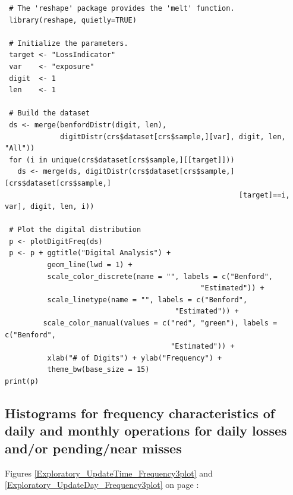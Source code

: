 \documentclass{DissertateUSU}
\begin{document}
\begin{verbatim}
 # The 'reshape' package provides the 'melt' function.
 library(reshape, quietly=TRUE)
 
 # Initialize the parameters.
 target <- "LossIndicator"
 var    <- "exposure"
 digit  <- 1
 len    <- 1
 
 # Build the dataset
 ds <- merge(benfordDistr(digit, len),
             digitDistr(crs$dataset[crs$sample,][var], digit, len, "All"))
 for (i in unique(crs$dataset[crs$sample,][[target]]))
   ds <- merge(ds, digitDistr(crs$dataset[crs$sample,][crs$dataset[crs$sample,]
                                                       [target]==i, var], digit, len, i))
 
 # Plot the digital distribution
 p <- plotDigitFreq(ds)
 p <- p + ggtitle("Digital Analysis") +
          geom_line(lwd = 1) +
          scale_color_discrete(name = "", labels = c("Benford",
                                              "Estimated")) +
          scale_linetype(name = "", labels = c("Benford",
                                        "Estimated")) +
         scale_color_manual(values = c("red", "green"), labels = c("Benford",
                                       "Estimated")) +
          xlab("# of Digits") + ylab("Frequency") +
          theme_bw(base_size = 15)
print(p)
\end{verbatim}

\normalsize

\subsection{Histograms for frequency characteristics of daily and monthly operations for daily losses and/or pending/near misses}
\label{ssec:Frequency characteristics of operational activity}

Figures \ref{Exploratory_UpdateTime_Frequency3plot} and
\ref{Exploratory_UpdateDay_Frequency3plot} on page
\pageref{Exploratory_UpdateTime_Frequency3plot}:

\small
\end{document}
